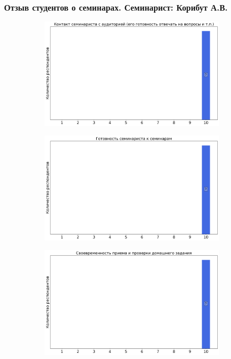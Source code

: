     \subsubsection{Отзыв студентов о семинарах. Семинарист: Корибут А.В.}
		\begin{figure}[H]
			\centering
			\begin{subfigure}[b]{0.45\textwidth}
				\centering
				\includegraphics[width=\textwidth]{images/4 course/Квантовая механика/seminarists-marks-Корибут А.В.-0.png}
			\end{subfigure}
			\begin{subfigure}[b]{0.45\textwidth}
				\centering
				\includegraphics[width=\textwidth]{images/4 course/Квантовая механика/seminarists-marks-Корибут А.В.-1.png}
			\end{subfigure}
			\begin{subfigure}[b]{0.45\textwidth}
				\centering
				\includegraphics[width=\textwidth]{images/4 course/Квантовая механика/seminarists-marks-Корибут А.В.-2.png}

\end{subfigure}
\end{figure}
